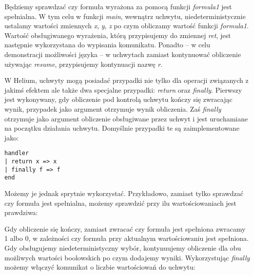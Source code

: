 

Będziemy sprawdzać czy formuła wyrażona za pomocą funkcji \textit{formula1} jest spełnialna. W tym celu w funkcji \textit{main}, wewnątrz uchwytu, niedeterministycznie ustalamy wartości zmiennych \textit{x}, \textit{y}, \textit{z} po czym obliczamy wartość funkcji \textit{formula1}. Wartość obsługiwanego wyrażenia, którą przypisujemy do zmiennej \textit{ret}, jest następnie wykorzystana do wypisania komunikatu. Ponadto -- w celu demonstracji możliwości języka -- w uchwytach zamiast kontynuować obliczenie używając \textit{resume}, przypisujemy kontynuacji nazwę \textit{r}.

W Helium, uchwyty mogą posiadać przypadki nie tylko dla operacji związanych z jakimś efektem ale także dwa specjalne przypadki: \textit{return} oraz \textit{finally}. Pierwszy jest wykonywany, gdy obliczenie pod kontrolą uchwytu kończy się zwracając wynik, przypadek jako argument otrzymuje wynik obliczenia. Zaś \textit{finally} otrzymuje jako argument obliczenie obsługiwane przez uchwyt i jest uruchamiane na początku działania uchwytu. Domyślnie przypadki te są zaimplementowane jako:

\begin{lstlisting}
handler
| return x => x
| finally f => f
end
\end{lstlisting}

Możemy je jednak sprytnie wykorzystać. Przykładowo, zamiast tylko sprawdzać czy formuła jest spełnialna, możemy sprawdzić przy ilu wartościowaniach jest prawdziwa:





Gdy obliczenie się kończy, zamiast zwracać czy formuła jest spełniona zwracamy 1 albo 0, w zależności czy formuła przy aktualnym wartościowaniu jest spełniona. Gdy obsługujemy niedeterministyczny wybór, kontynuujemy obliczenie dla obu możliwych wartości boolowskich po czym dodajemy wyniki. Wykorzystując \textit{finally} możemy włączyć komunikat o liczbie wartościowań do uchwytu:

